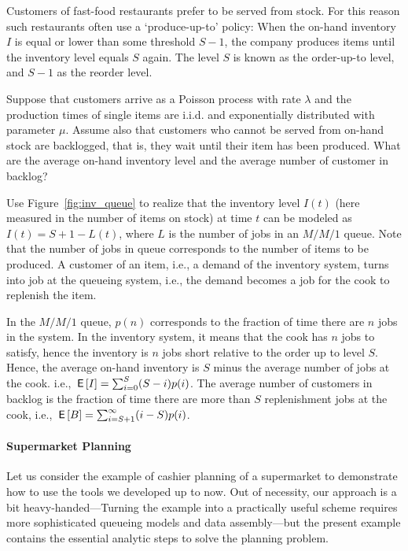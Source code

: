 \begin{exercise}\label{ex:7}
Customers of fast-food restaurants prefer to be served from stock. For this reason such
restaurants often use a `produce-up-to' policy: When the on-hand inventory $I$ is equal or lower than some threshold $S-1$, the company produces items until the inventory level equals $S$ again. The level $S$ is known as the order-up-to level, and $S-1$ as the reorder level.

Suppose that customers arrive as a Poisson process with rate $\lambda$
and the production times of single items are i.i.d. and exponentially
distributed with parameter $\mu$. Assume also that customers who
cannot be served from on-hand stock are backlogged, that is, they wait
until their item has been produced. What are the average on-hand
inventory level and the average number of customer in backlog?
\begin{hint}
Use Figure~\ref{fig:inv_queue} to realize that the inventory level $I(t)$ (here measured in the number of items on stock) at time $t$ can be
  modeled as $I(t) = S+1-L(t)$, where $L$ is the number of jobs in an
  $M/M/1$ queue. Note that the number of jobs in queue corresponds to the number of items to be produced. A customer of an item, i.e., a demand of the inventory system, turns into  job at the queueing system, i.e., the demand becomes a job for the cook to replenish the item.
\end{hint}
  \begin{solution}
In the $M/M/1$ queue, $p(n)$ corresponds to the fraction of time there are $n$ jobs in the system. In the inventory system, it means that the cook has $n$ jobs to satisfy, hence the inventory is $n$ jobs short relative to the order up to level $S$.  Hence, the average on-hand inventory is $S$ minus the average number of jobs at the cook. i.e., $\,\mathsf{E}\left[I\right] = \sum_{i=0}^{S} (S-i) p(i)$. The average number of customers in backlog is the fraction of time there are more than $S$ replenishment jobs at the cook, i.e., $\,\mathsf{E}\left[B\right] = \sum_{i=S+1}^\infty (i-S) p(i)$. 
  \end{solution}
\end{exercise}


\paragraph{Supermarket Planning}

Let us consider the example of cashier planning of a supermarket to
demonstrate how to use the tools we developed up to now. Out of
necessity, our approach is a bit heavy-handed---Turning the example
into a practically useful scheme requires more sophisticated queueing
models and data assembly---but the present example contains the
essential analytic steps to solve the planning problem.

